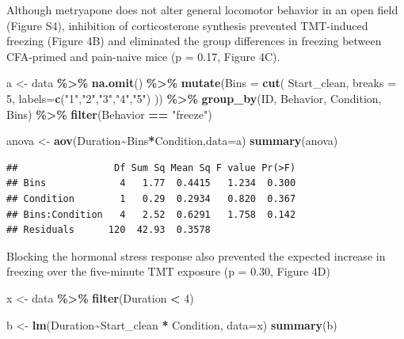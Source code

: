 \documentclass[
]{book}
\newenvironment{Shaded}{\begin{snugshade}}{\end{snugshade}}
\newcommand{\AttributeTok}[1]{\textcolor[rgb]{0.13,0.29,0.53}{#1}}
\newcommand{\DecValTok}[1]{\textcolor[rgb]{0.00,0.00,0.81}{#1}}
\newcommand{\FunctionTok}[1]{\textcolor[rgb]{0.13,0.29,0.53}{\textbf{#1}}}
\newcommand{\NormalTok}[1]{#1}
\newcommand{\OtherTok}[1]{\textcolor[rgb]{0.56,0.35,0.01}{#1}}
\newcommand{\SpecialCharTok}[1]{\textcolor[rgb]{0.81,0.36,0.00}{\textbf{#1}}}
\newcommand{\StringTok}[1]{\textcolor[rgb]{0.31,0.60,0.02}{#1}}
\begin{document}
Although metryapone does not alter general locomotor behavior in an open field (Figure S4), inhibition of corticosterone synthesis prevented TMT-induced freezing (Figure 4B) and eliminated the group differences in freezing between CFA-primed and pain-naive mice (p = 0.17, Figure 4C).

\begin{Shaded}
\begin{Highlighting}[]
\NormalTok{a }\OtherTok{\textless{}{-}}\NormalTok{ data }\SpecialCharTok{\%\textgreater{}\%}
  \FunctionTok{na.omit}\NormalTok{() }\SpecialCharTok{\%\textgreater{}\%}
  \FunctionTok{mutate}\NormalTok{(}\AttributeTok{Bins =} \FunctionTok{cut}\NormalTok{(}
\NormalTok{    Start\_clean,}
    \AttributeTok{breaks =} \DecValTok{5}\NormalTok{,}
    \AttributeTok{labels=}\FunctionTok{c}\NormalTok{(}\StringTok{"1"}\NormalTok{,}\StringTok{"2"}\NormalTok{,}\StringTok{"3"}\NormalTok{,}\StringTok{"4"}\NormalTok{,}\StringTok{"5"}\NormalTok{)}
\NormalTok{  )) }\SpecialCharTok{\%\textgreater{}\%}
  \FunctionTok{group\_by}\NormalTok{(ID, Behavior, Condition, Bins) }\SpecialCharTok{\%\textgreater{}\%}
  \FunctionTok{filter}\NormalTok{(Behavior }\SpecialCharTok{==} \StringTok{"freeze"}\NormalTok{)}

\NormalTok{anova }\OtherTok{\textless{}{-}} \FunctionTok{aov}\NormalTok{(Duration}\SpecialCharTok{\textasciitilde{}}\NormalTok{Bins}\SpecialCharTok{*}\NormalTok{Condition,}\AttributeTok{data=}\NormalTok{a)}
\FunctionTok{summary}\NormalTok{(anova)}
\end{Highlighting}
\end{Shaded}

\begin{verbatim}
##                 Df Sum Sq Mean Sq F value Pr(>F)
## Bins             4   1.77  0.4415   1.234  0.300
## Condition        1   0.29  0.2934   0.820  0.367
## Bins:Condition   4   2.52  0.6291   1.758  0.142
## Residuals      120  42.93  0.3578
\end{verbatim}

Blocking the hormonal stress response also prevented the expected increase in freezing over the five-minute TMT exposure (p = 0.30, Figure 4D)

\begin{Shaded}
\begin{Highlighting}[]
\NormalTok{x }\OtherTok{\textless{}{-}}\NormalTok{ data }\SpecialCharTok{\%\textgreater{}\%}
  \FunctionTok{filter}\NormalTok{(Duration }\SpecialCharTok{\textless{}} \DecValTok{4}\NormalTok{)}

\NormalTok{b }\OtherTok{\textless{}{-}} \FunctionTok{lm}\NormalTok{(Duration}\SpecialCharTok{\textasciitilde{}}\NormalTok{Start\_clean }\SpecialCharTok{*}\NormalTok{ Condition, }\AttributeTok{data=}\NormalTok{x)}
\FunctionTok{summary}\NormalTok{(b)}
\end{Highlighting}
\end{Shaded}
\end{document}
